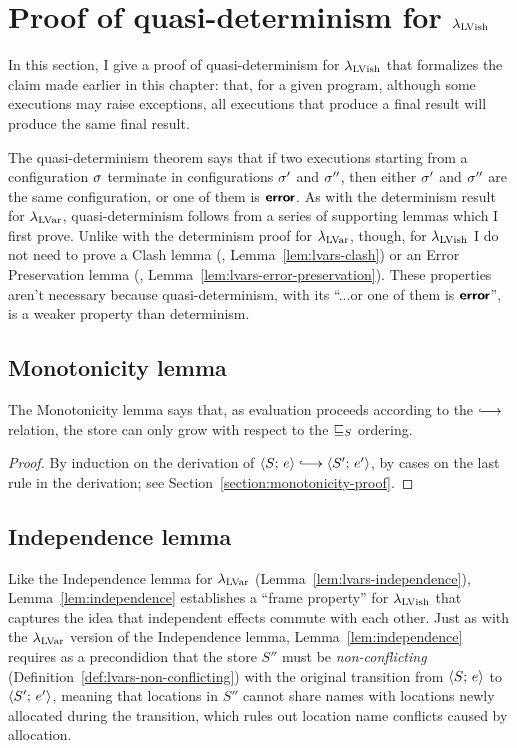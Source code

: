 \section{Proof of quasi-determinism for $\lambda_{\textrm{LVish}}$}\label{s:quasi-proof-of-quasi-determinism}

In this section, I give a proof of quasi-determinism for
$\lambda_{\textrm{LVish}}$ that formalizes the claim made earlier in this chapter:
that, for a given program, although some executions may raise
exceptions, all executions that produce a final result will produce
the same final result.

The quasi-determinism theorem says that if two executions starting
from a configuration $\sigma$ terminate in configurations $\sigma'$ and
$\sigma''$, then either $\sigma'$ and $\sigma''$ are the same
configuration, or one of them is $\textbf{\textsf{error}}$.  As with the determinism
result for $\lambda_{\textrm{LVar}}$, quasi-determinism follows from a series of
supporting lemmas which I first prove.  Unlike with the determinism
proof for $\lambda_{\textrm{LVar}}$, though, for $\lambda_{\textrm{LVish}}$ I do not need to
prove a Clash lemma (\eg, Lemma~\ref{lem:lvars-clash}) or an Error
Preservation lemma (\eg, Lemma~\ref{lem:lvars-error-preservation}).
These properties aren't necessary because quasi-determinism, with its
``...or one of them is $\textbf{\textsf{error}}$'', is a weaker property than
determinism.

\subsection{Monotonicity lemma}\label{subsection:quasi-monotonicity}

The Monotonicity lemma says that, as evaluation proceeds according to
the $\parstepsto$ relation, the store can only grow with respect to
the $ \sqsubseteq_S $ ordering.

\LemMonotonicity
\begin{proof}
  By induction on the derivation of $\config{S}{e} \parstepsto
  \config{S'}{e'}$, by cases on the last rule in the derivation; see
  Section~\ref{section:monotonicity-proof}.
\end{proof}

\subsection{Independence lemma}\label{subsection:quasi-independence}

Like the Independence lemma for $\lambda_{\textrm{LVar}}$
(Lemma~\ref{lem:lvars-independence}), Lemma~\ref{lem:independence}
establishes a ``frame property'' for $\lambda_{\textrm{LVish}}$ that captures the
idea that independent effects commute with each other.  Just as with
the $\lambda_{\textrm{LVar}}$ version of the Independence lemma,
Lemma~\ref{lem:independence} requires as a precondidion that the store
$S''$ must be \emph{non-conflicting}
(Definition~\ref{def:lvars-non-conflicting}) with the original
transition from $\langle S;\, e \rangle$ to $\langle S';\, e' \rangle$, meaning that
locations in $S''$ cannot share names with locations newly allocated
during the transition, which rules out location name conflicts caused
by allocation.

